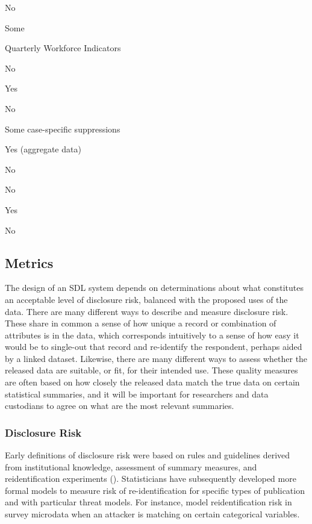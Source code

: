\documentclass[
]{WileySix}
\begin{document}
No

Some

Quarterly Workforce Indicators

No

Yes

No

Some case-specific suppressions

Yes (aggregate data)

No

No

Yes

No

\hypertarget{metrics}{%
\subsection{Metrics}\label{metrics}}

The design of an SDL system depends on determinations about what constitutes an acceptable level of disclosure risk, balanced with the proposed uses of the data. There are many different ways to describe and measure disclosure risk. These share in common a sense of how unique a record or combination of attributes is in the data, which corresponds intuitively to a sense of how easy it would be to single-out that record and re-identify the respondent, perhaps aided by a linked dataset. Likewise, there are many different ways to assess whether the released data are suitable, or fit, for their intended use. These quality measures are often based on how closely the released data match the true data on certain statistical summaries, and it will be important for researchers and data custodians to agree on what are the most relevant summaries.

\hypertarget{disclosure-risk}{%
\subsubsection{Disclosure Risk}\label{disclosure-risk}}

Early definitions of disclosure risk were based on rules and guidelines derived from institutional knowledge, assessment of summary measures, and reidentification experiments (\citet{harris-kojetin_statistical_2005}). Statisticians have subsequently developed more formal models to measure risk of re-identification for specific types of publication and with particular threat models. For instance, \citet{shlomo_assessing_2010} model reidentification risk in survey microdata when an attacker is matching on certain categorical variables.
\end{document}
